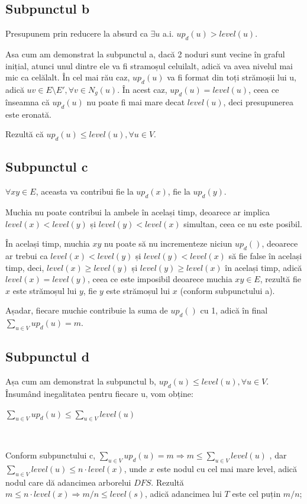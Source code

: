 \documentclass{article}
\begin{document}
\subsection*{\fontsize{16}{30}\selectfont Subpunctul b}
{\fontsize{14}{16}\selectfont
Presupunem prin reducere la absurd ca $\exists u$ a.i. $up_d(u) > level(u)$. 
\par Asa cum am demonstrat la subpunctul a, dacă 2 noduri sunt vecine în graful inițial, atunci unul dintre ele va fi stramoșul celuilalt, adică va avea nivelul mai mic ca celălalt.  În cel mai rău caz, $up_d(u)$ va fi format din toți strămoșii lui u, adică $uv \in E \setminus E', \forall v \in N_g(u)$. În acest caz, $up_d(u) = level(u)$, ceea ce înseamna că $up_d(u)$ nu poate fi mai mare decat $level(u)$, deci presupunerea este eronată.
\par Rezultă că $up_d(u) \le level(u), \forall u \in V$. 
}

\subsection*{\fontsize{16}{30}\selectfont Subpunctul c}
{\fontsize{14}{16}\selectfont
$\forall xy \in E$, aceasta va contribui fie la $up_d(x)$, fie la $up_d(y)$.
\par Muchia nu poate contribui la ambele în același timp, deoarece ar implica $level(x) < level(y)$ și $level(y) < level(x)$ simultan, ceea ce nu este posibil. 
\par În același timp, muchia $xy$ nu poate să nu incrementeze niciun $up_d()$, deoarece ar trebui ca $level(x) < level(y)$ și $level(y) < level(x)$ să fie false în același timp, deci, $level(x) \ge level(y)$ și $level(y) \ge level(x)$ în același timp, adică $level(x) = level(y)$, ceea ce este imposibil deoarece muchia $xy \in E$, rezultă fie $x$ este strămoșul lui $y$, fie $y$ este strămoșul lui $x$ (conform subpunctului a).
\par Așadar, fiecare muchie contribuie la suma de $up_d()$ cu 1, adică în final $\sum_{u \in V} {up}_d(u)
 = m$.
}

\subsection*{\fontsize{16}{30}\selectfont Subpunctul d}
{\fontsize{14}{16}\selectfont
Așa cum am demonstrat la subpunctul b, $up_d(u) \le level(u), \forall u \in V$. Însumând inegalitatea pentru fiecare u, vom obține: \\
 \centerline {$\sum_{u \in V} {up}_d(u) \le \sum_{u \in V} {level(u)}$ } \\
 \par Conform subpunctului c, $\sum_{u \in V} {up}_d(u) = m \Rightarrow m \le \sum_{u \in V} {level(u)}$ , dar $\sum_{u \in V} {level(u)} \le n \cdot level(x)$, unde $x$ este nodul cu cel mai mare level, adică nodul care dă adancimea arborelui $DFS$. Rezultă $m \le n \cdot level(x) \Rightarrow m/n \le level(s)$, adică adancimea lui $T$ este cel puțin $m/n$; 
}
\end{document}
